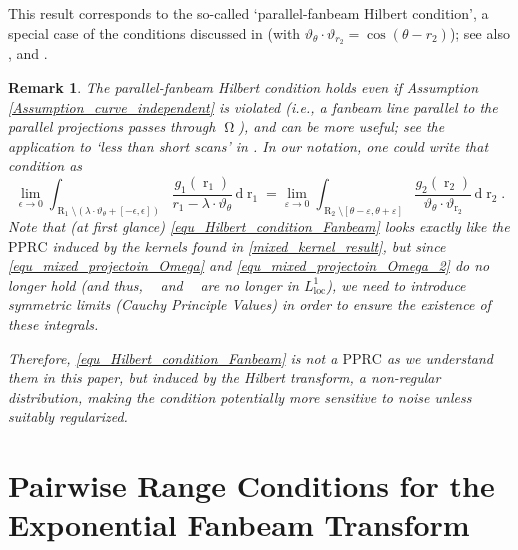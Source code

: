 \documentclass[12pt]{article}
\newtheorem{remark}[theorem]{Remark}
\newcommand{\dd}[1]{\,\mathrm{d}{#1}}
\DeclareMathOperator{\rayvariable}{r}
\DeclareMathOperator{\raygroundset}{R}
\DeclareMathOperator{\Vone}{V_1}
\DeclareMathOperator{\Vtwo}{V_2}
\newcommand{\conditionname}{$\mathrm{PPRC}$}
\DeclareMathOperator{\imgdom}{{\Omega}}
\begin{document}
This result corresponds to the so-called `parallel-fanbeam Hilbert condition', a special case of the conditions discussed in \cite[Section 4]{Hamaker_divergent_beam_1980} (with $\vartheta_\theta \cdot\vartheta_{r_2}=\cos(\theta-r_2)$); see also \cite[Equation (14)]{5484190}, and \cite{Frederic_Noo_2002,new_data_consistency_fanbeam}. 



\begin{remark}\label{remark_mixed_hilbert_transform}
The parallel-fanbeam Hilbert condition holds even if Assumption \ref{Assumption_curve_independent} is violated (i.e., a fanbeam line parallel to the parallel projections passes through $\imgdom$), and can be more useful; see the application to `less than short scans' in \cite{Frederic_Noo_2002}. In our notation, one could write that condition as 
\begin{equation}\label{equ_Hilbert_condition_Fanbeam}
\lim_{\epsilon\to 0}\int_{\raygroundset_1\setminus \left(\lambda\cdot \vartheta_\theta+ [-\epsilon,\epsilon]\right)} \frac{g_1(\rayvariable_1)}{r_1-\lambda\cdot \vartheta_\theta} \dd {\rayvariable_1}
=
\lim_{\varepsilon\to 0}\int_{\raygroundset_2\setminus{[\theta-\varepsilon,\theta+\varepsilon]}} \frac{g_2(\rayvariable_2)}{\vartheta_\theta \cdot \vartheta_{\rayvariable_2}} \dd {\rayvariable_2}.
\end{equation}
Note that (at first glance) \eqref{equ_Hilbert_condition_Fanbeam} looks exactly like the \conditionname{} induced by the kernels found in \eqref{mixed_kernel_result}, but since \eqref{equ_mixed_projectoin_Omega} and \eqref{equ_mixed_projectoin_Omega_2} do no longer hold (and thus, $\Vone$ and $\Vtwo$ are no longer in $L^1_\text{loc}$), we need to introduce symmetric limits (Cauchy Principle Values) in order to ensure the existence of these integrals.

Therefore, \eqref{equ_Hilbert_condition_Fanbeam} is not a \conditionname{} as we understand them in this paper, but induced by the Hilbert transform, a non-regular distribution, making the condition potentially more sensitive to noise unless suitably regularized. 

\end{remark}




\section{Pairwise Range Conditions for the Exponential Fanbeam Transform}
\label{section_no_condition_for_exponential_fanbeam}
\end{document}
